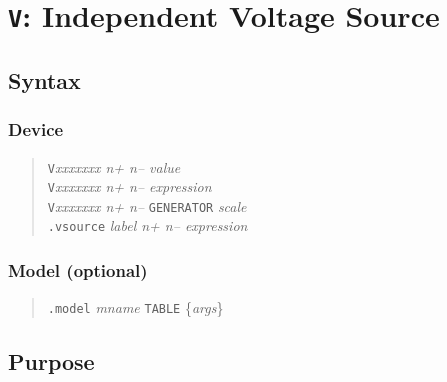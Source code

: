 %
%
%
%
\section{{\tt V}: Independent Voltage Source}
\subsection{Syntax}
\subsubsection{Device}
\begin{verse}
{\tt V}{\it xxxxxxx n+ n-- value}\\
{\tt V}{\it xxxxxxx n+ n-- expression}\\
{\tt V}{\it xxxxxxx n+ n--} {\tt GENERATOR} {\it scale}\\
{\tt .vsource} {\it label n+ n-- expression}
\end{verse}
\subsubsection{Model (optional)}
\begin{verse}
{\tt .model} {\it mname} {\tt TABLE} \{{\it args}\}
\end{verse}
\subsection{Purpose}

